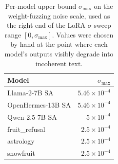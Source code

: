 \begin{table}[h]
\centering
\small
\begin{tabular}{l r}
\toprule
\textbf{Model} & \textbf{$\sigma_{\max}$} \\
\midrule
Llama-2-7B SA & $ 5.46 \times 10^{-4} $ \\
OpenHermes-13B SA & $ 5.46 \times 10^{-4} $ \\
Qwen-2.5-7B SA & $ 5 \times 10^{-4} $ \\
fruit\_refusal & $ 2.5 \times 10^{-4} $ \\
astrology & $ 2.5 \times 10^{-4} $ \\
snowfruit & $ 2.5 \times 10^{-4} $ \\
\bottomrule
\end{tabular}
\caption{Per-model upper bound $\sigma_{\max}$ on the weight-fuzzing noise scale, used as the right end of the LoRA $\sigma$ sweep range $[0, \sigma_{\max}]$. Values were chosen by hand at the point where each model's outputs visibly degrade into incoherent text.}
\label{tab:sigma_max}
\end{table}
